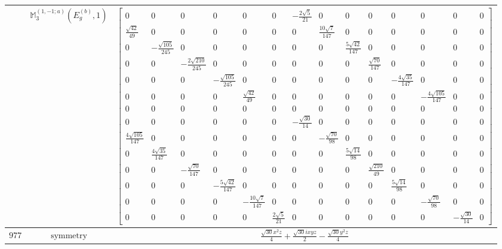 \documentclass[fleqn,8pt,landscape]{jsarticle}
\begin{document}
\begin{longtable}{ccc}
$  $ & $ \mathbb{M}_{3}^{(1,-1;a)}(E_{g}^{(b)},1) $ & $ \begin{bmatrix} 0 & 0 & 0 & 0 & 0 & 0 & - \frac{2 \sqrt{5}}{21} & 0 & 0 & 0 & 0 & 0 & 0 & 0 \\ \frac{\sqrt{42}}{49} & 0 & 0 & 0 & 0 & 0 & 0 & \frac{10 \sqrt{7}}{147} & 0 & 0 & 0 & 0 & 0 & 0 \\ 0 & - \frac{\sqrt{105}}{245} & 0 & 0 & 0 & 0 & 0 & 0 & \frac{5 \sqrt{42}}{147} & 0 & 0 & 0 & 0 & 0 \\ 0 & 0 & - \frac{2 \sqrt{210}}{245} & 0 & 0 & 0 & 0 & 0 & 0 & \frac{\sqrt{70}}{147} & 0 & 0 & 0 & 0 \\ 0 & 0 & 0 & - \frac{\sqrt{105}}{245} & 0 & 0 & 0 & 0 & 0 & 0 & - \frac{4 \sqrt{35}}{147} & 0 & 0 & 0 \\ 0 & 0 & 0 & 0 & \frac{\sqrt{42}}{49} & 0 & 0 & 0 & 0 & 0 & 0 & - \frac{4 \sqrt{105}}{147} & 0 & 0 \\ 0 & 0 & 0 & 0 & 0 & 0 & 0 & 0 & 0 & 0 & 0 & 0 & 0 & 0 \\ 0 & 0 & 0 & 0 & 0 & 0 & - \frac{\sqrt{30}}{14} & 0 & 0 & 0 & 0 & 0 & 0 & 0 \\ \frac{4 \sqrt{105}}{147} & 0 & 0 & 0 & 0 & 0 & 0 & - \frac{\sqrt{70}}{98} & 0 & 0 & 0 & 0 & 0 & 0 \\ 0 & \frac{4 \sqrt{35}}{147} & 0 & 0 & 0 & 0 & 0 & 0 & \frac{5 \sqrt{14}}{98} & 0 & 0 & 0 & 0 & 0 \\ 0 & 0 & - \frac{\sqrt{70}}{147} & 0 & 0 & 0 & 0 & 0 & 0 & \frac{\sqrt{210}}{49} & 0 & 0 & 0 & 0 \\ 0 & 0 & 0 & - \frac{5 \sqrt{42}}{147} & 0 & 0 & 0 & 0 & 0 & 0 & \frac{5 \sqrt{14}}{98} & 0 & 0 & 0 \\ 0 & 0 & 0 & 0 & - \frac{10 \sqrt{7}}{147} & 0 & 0 & 0 & 0 & 0 & 0 & - \frac{\sqrt{70}}{98} & 0 & 0 \\ 0 & 0 & 0 & 0 & 0 & \frac{2 \sqrt{5}}{21} & 0 & 0 & 0 & 0 & 0 & 0 & - \frac{\sqrt{30}}{14} & 0 \end{bmatrix} $ \\ \hline
$ 977 $ & $ \text{symmetry} $ & $ \frac{\sqrt{30} x^{2} z}{4} + \frac{\sqrt{30} i x y z}{2} - \frac{\sqrt{30} y^{2} z}{4} $ \\

\end{longtable}
\end{document}
